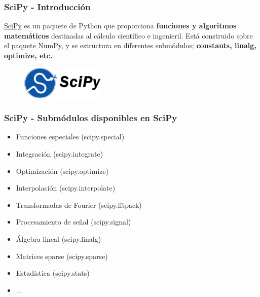 \documentclass[18pt]{beamer}
\begin{document}
\begin{frame}

	\frametitle{SciPy - Introducción}

	\href{https://www.scipy.org/scipylib/index.html}{SciPy}
	es un paquete de Python que proporciona \textbf{funciones y 
	algoritmos matemáticos} destinadas al cálculo científico e 
	ingenieril. 
	Está construido sobre el paquete NumPy, y se estructura en diferentes 
	submódulos; \textbf{constants, linalg, optimize, etc.}
	
	\vspace{0.4cm}
	
	\begin{figure}
		\includegraphics[width=4.0cm]{images/scipy.png}
	\end{figure}
	
\end{frame}


\begin{frame}
	
	\frametitle{SciPy - Submódulos disponibles en SciPy}

	\begin{itemize}
		\setlength\itemsep{0.3em}
		\item Funciones especiales (scipy.special)
		\item Integración (scipy.integrate)
		\item Optimización (scipy.optimize)
		\item Interpolación (scipy.interpolate)
		\item Transformadas de Fourier (scipy.fftpack)
		\item Procesamiento de señal (scipy.signal)
		\item Álgebra lineal (scipy.linalg)
		\item Matrices sparse (scipy.sparse)
		\item Estadística (scipy.stats)
		\item ...
	\end{itemize}
	
\end{frame}
\end{document}
